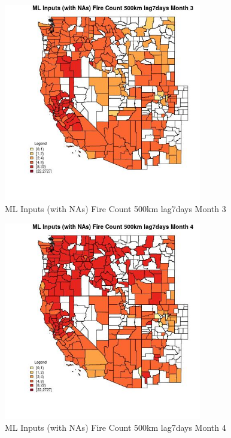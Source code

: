 \begin{figure} 
\centering  
\includegraphics[width=0.77\textwidth]{Code_Outputs/Report_ML_input_PM25_Step4_part_f_de_duplicated_aves_prioritize_24hr_obswNAs_CountyFire_Count_500km_lag7daysmedianMonth3.jpg} 
\caption{\label{fig:Report_ML_input_PM25_Step4_part_f_de_duplicated_aves_prioritize_24hr_obswNAsCountyFire_Count_500km_lag7daysmedianMonth3}ML Inputs (with NAs) Fire Count 500km lag7days Month 3} 
\end{figure} 
 

\begin{figure} 
\centering  
\includegraphics[width=0.77\textwidth]{Code_Outputs/Report_ML_input_PM25_Step4_part_f_de_duplicated_aves_prioritize_24hr_obswNAs_CountyFire_Count_500km_lag7daysmedianMonth4.jpg} 
\caption{\label{fig:Report_ML_input_PM25_Step4_part_f_de_duplicated_aves_prioritize_24hr_obswNAsCountyFire_Count_500km_lag7daysmedianMonth4}ML Inputs (with NAs) Fire Count 500km lag7days Month 4} 
\end{figure} 
 

